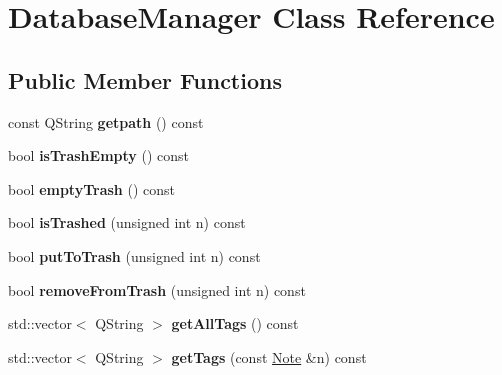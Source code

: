 \hypertarget{class_database_manager}{\section{Database\-Manager Class Reference}
\label{class_database_manager}
}
\subsection*{Public Member Functions}
\begin{DoxyCompactItemize}
\item 
\hypertarget{class_database_manager_a02f2ab0a227055c58d5343d7adbc4dcb}{const Q\-String {\bfseries getpath} () const }\label{class_database_manager_a02f2ab0a227055c58d5343d7adbc4dcb}

\item 
\hypertarget{class_database_manager_a9e67d16734e9125f119d53d2ce9dd11e}{bool {\bfseries is\-Trash\-Empty} () const }\label{class_database_manager_a9e67d16734e9125f119d53d2ce9dd11e}

\item 
\hypertarget{class_database_manager_abac20f4310496e2dd3b045c6aa788b5a}{bool {\bfseries empty\-Trash} () const }\label{class_database_manager_abac20f4310496e2dd3b045c6aa788b5a}

\item 
\hypertarget{class_database_manager_a75856a89b4281b6b42a2ef68aaf7db1e}{bool {\bfseries is\-Trashed} (unsigned int n) const }\label{class_database_manager_a75856a89b4281b6b42a2ef68aaf7db1e}

\item 
\hypertarget{class_database_manager_abaac36bbd798652c7d4a86de36ac29bc}{bool {\bfseries put\-To\-Trash} (unsigned int n) const }\label{class_database_manager_abaac36bbd798652c7d4a86de36ac29bc}

\item 
\hypertarget{class_database_manager_a92352c753e7909e9672f1b1a562784e6}{bool {\bfseries remove\-From\-Trash} (unsigned int n) const }\label{class_database_manager_a92352c753e7909e9672f1b1a562784e6}

\item 
\hypertarget{class_database_manager_afe273713f7c5a5a38d3b50aa94365568}{std\-::vector$<$ Q\-String $>$ {\bfseries get\-All\-Tags} () const }\label{class_database_manager_afe273713f7c5a5a38d3b50aa94365568}

\item 
\hypertarget{class_database_manager_aca5944a7b8f1a9de795f74a57296e4bb}{std\-::vector$<$ Q\-String $>$ {\bfseries get\-Tags} (const \hyperlink{class_note}{Note} \&n) const }\label{class_database_manager_aca5944a7b8f1a9de795f74a57296e4bb}


\end{DoxyCompactItemize}
